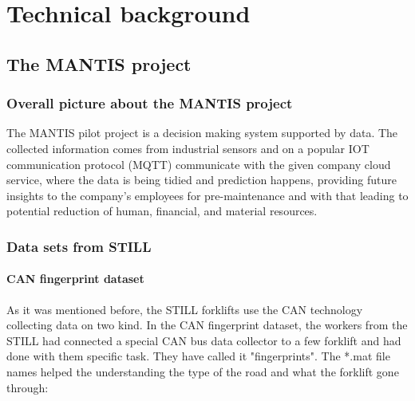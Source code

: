 \chapter{Technical background}
	\section{The MANTIS project}
		\subsection{Overall picture about the MANTIS project}
The MANTIS pilot project is a decision making system supported by data. The collected information comes from industrial sensors and on a popular IOT communication protocol (MQTT) communicate with the given company cloud service, where the data is being tidied and prediction happens, providing future insights to the company's employees for pre-maintenance and with that leading to potential reduction of human, financial, and material resources.

		\subsection{Data sets from STILL}
			\subsubsection{CAN fingerprint dataset}
				\noindent
As it was mentioned before, the STILL forklifts use the CAN technology collecting data on two kind. In the CAN fingerprint dataset, the workers from the STILL had  connected a special CAN bus data collector to a few forklift and had done with them specific task. They have called it "fingerprints". The *.mat file names helped the understanding the type of the road and what the forklift gone through:

